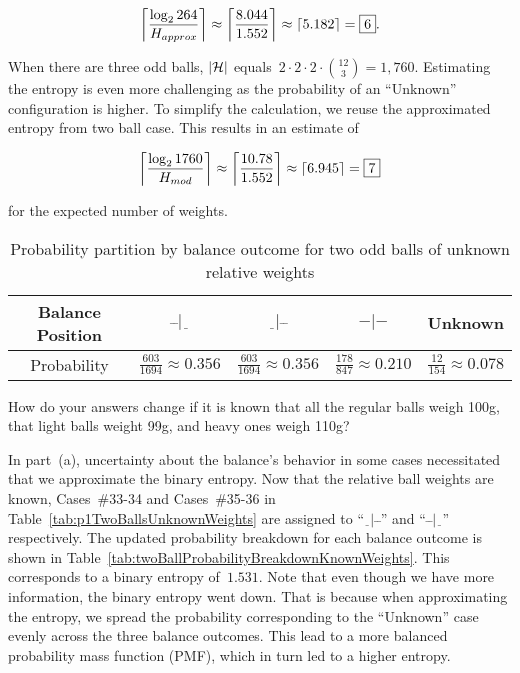   \[ \ceil*{\frac{\log_{2} 264}{H_{approx}}} \approx \ceil*{\frac{8.044}{1.552}} \approx \ceil*{5.182} = \boxed{6} \text{.} \]

  When there are three odd balls, $\abs{\mathcal{H}}$ equals~${2\cdot2\cdot2\cdot\binom{12}{3} = 1,760}$.  Estimating the entropy is even more challenging as the probability of an ``Unknown'' configuration is higher.  To simplify the calculation, we reuse the approximated entropy from two ball case.  This results in an estimate of

  \[ \ceil*{\frac{\log_{2} 1760}{H_{mod}}} \approx \ceil*{\frac{10.78}{1.552}} \approx \ceil*{6.945} = \boxed{7}\]

  \noindent
  for the expected number of weights.

  \begin{table}
    \centering
    \caption{Probability partition by balance outcome for two odd balls of unknown relative weights}\label{tab:twoBallProbabilityBreakdown}
    \begin{tabular}{|c||c|c|c|c|}
      \hline
      Balance Position & $\bar{~}\bar{~}|\underline{~~}$  & $\underline{~~}|\bar{~}\bar{~}$  & $-|-$ & Unknown \\\hline
      Probability      & $\frac{603}{1694} \approx 0.356$ & $\frac{603}{1694} \approx 0.356$ & $\frac{178}{847} \approx 0.210$ & $\frac{12}{154} \approx 0.078$    \\\hline
    \end{tabular}
  \end{table}

\begin{subproblem}
  How do your answers change if it is known that all the regular balls weigh 100g, that light balls weight 99g, and heavy ones weigh 110g?
\end{subproblem}

  In part~(a), uncertainty about the balance's behavior in some cases necessitated that we approximate the binary entropy.  Now that the relative ball weights are known, Cases~\#33-34 and Cases~\#35-36 in Table~\ref{tab:p1TwoBallsUnknownWeights} are assigned to ``${\underline{~~}|\bar{~}\bar{~}}$'' and ``${\bar{~}\bar{~}|\underline{~~}}$'' respectively.  The updated probability breakdown for each balance outcome is shown in Table~\ref{tab:twoBallProbabilityBreakdownKnownWeights}.  This corresponds to a binary entropy of~$1.531$.  Note that even though we have more information, the binary entropy went down.  That is because when approximating the entropy, we spread the probability corresponding to the ``Unknown'' case evenly across the three balance outcomes.  This lead to a more balanced probability mass function (PMF), which in turn led to a higher entropy.


